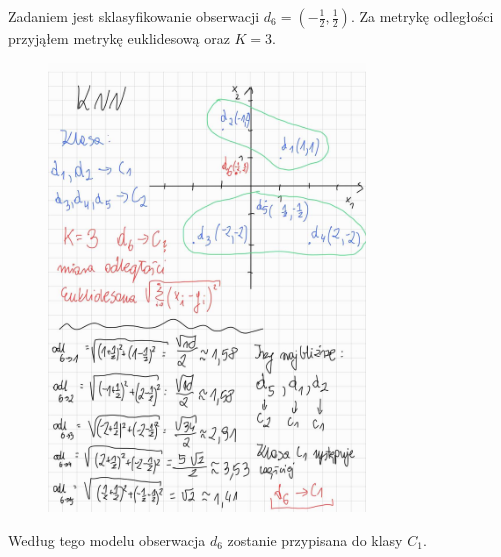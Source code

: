\documentclass{article}
\begin{document}
Zadaniem jest sklasyfikowanie obserwacji $d_6 = (-\frac{1}{2}, \frac{1}{2})$.
Za metrykę odległości przyjąłem metrykę euklidesową oraz $K=3$.

\begin{figure}[H]
    \centering
    \includegraphics[width=0.75\textwidth]{knn.jpg}
\end{figure}

Według tego modelu obserwacja $d_6$ zostanie przypisana do klasy $C_1$.
\end{document}
